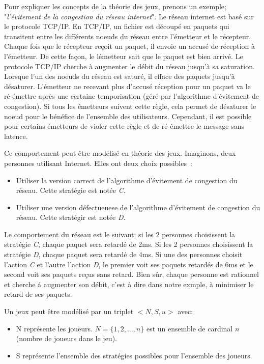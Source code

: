 Pour expliquer les concepts de la th\'eorie des jeux, prenons un exemple; "\emph{l'\'evitement de la congestion du r\'eseau internet}". Le r\'eseau internet est bas\'e sur le protocole TCP/IP. En TCP/IP, un fichier est d\'ecoup\'e en paquets qui transitent entre les diff\'erents noeuds du r\'eseau entre l'\'emetteur et le r\'ecepteur. Chaque fois que le r\'ecepteur re\c{c}oit un paquet, il envoie un accus\'e de r\'eception \`a l'\'emetteur. De cette fa\c{c}on, le l\'emetteur sait que le paquet est bien arriv\'e. Le protocole TCP/IP cherche \`a augmenter le d\'ebit du r\'eseau jusqu'\`a sa saturation. Lorsque l'un des noeuds du r\'eseau est satur\'e, il efface des paquets jusqu'\`a d\'esaturer. L'\'emetteur ne recevant plus d'accus\'e r\'eception pour un paquet va le r\'e-\'emettre apr\`es une certaine temporisation (g\'er\'e par l'algorithme d'\'evitement de congestion). Si tous les \'emetteurs suivent cette r\`egle, cela  permet de d\'esaturer le noeud pour le b\'en\'efice de l'ensemble des utilisateurs. Cependant, il est possible pour certains \'emetteurs de violer cette r\`egle et de r\'e-\'emettre le message sans latence. 

Ce comportement peut \^etre mod\'elis\'e en th\'eorie des jeux.  Imaginons, deux personnes utilisant Internet. Elles ont deux choix possibles\ :
\begin{itemize}
\item Utiliser la version correct de l'algorithme d'\'evitement de congestion du r\'eseau. Cette strat\'egie est not\'ee \emph{C}.
\item Utiliser une version d\'efectueuese de l'algorithme d'\'evitement de congestion du r\'eseau. Cette strat\'egir est not\'ee \emph{D}.
\end{itemize}

Le comportement du r\'eseau est le suivant; si les 2 personnes choisissent la strat\'egie \emph{C}, chaque paquet sera retard\'e de 2ms. Si les 2 personnes choisissent la strat\'egie \emph{D}, chaque paquet sera retard\'e de 4ms. Si une des personnes choisit l'action \emph{C} et l'autre l'action \emph{D}, le premier voit ses paquets retard\'es de 6ms et le second voit ses paquets re\c{c}us sans retard. Bien s\^ur, chaque personne est rationnel et cherche \'a augmenter son d\'ebit, c'est \`a dire dans notre exmple, \`a minimiser le retard de ses paquets.


\begin{defn}
Un jeux peut \^etre mod\'elis\'e par un triplet $<N, S, u>$ avec:
\begin{itemize}
\item N repr\'esente les joueurs. $N = \{1,2,\ldots,n\}$ est un ensemble de cardinal $n$ (nombre de joueurs dans le jeu). 
\item S repr\'esente l'ensemble des strat\'egies possibles pour l'ensemble des joueurs.
\end{itemize}
\end{defn}


